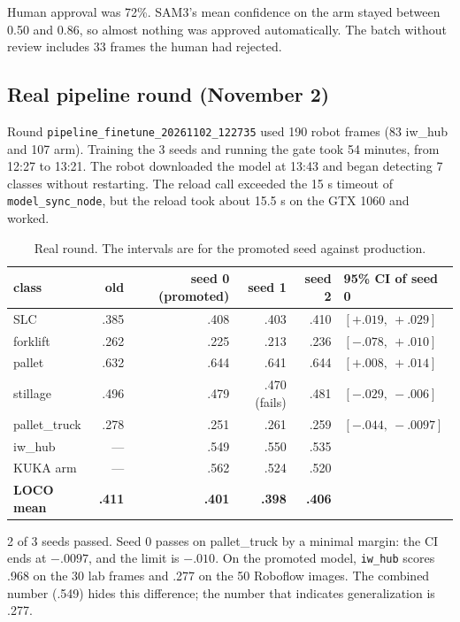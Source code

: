 \documentclass[11pt,a4paper]{article}
\begin{document}
Human approval was 72\%. SAM3's mean confidence on the arm stayed between 0.50 and
0.86, so almost nothing was approved automatically. The batch without review
includes 33 frames the human had rejected.

\subsection{Real pipeline round (November 2)}

Round \texttt{pipeline\_finetune\_20261102\_122735} used 190 robot frames (83
iw\_hub and 107 arm). Training the 3 seeds and running the gate took 54 minutes,
from 12:27 to 13:21. The robot downloaded the model at 13:43 and began detecting 7
classes without restarting. The reload call exceeded the 15 s timeout of
\texttt{model\_sync\_node}, but the reload took about 15.5 s on the GTX 1060 and
worked.

\begin{table}[H]
\centering\small
\caption{Real round. The intervals are for the promoted seed against production.}
\label{tab:round}
\begin{tabular}{lrrrrl}
\toprule
class & old & seed 0 (promoted) & seed 1 & seed 2 & 95\% CI of seed 0 \\
\midrule
SLC & .385 & .408 & .403 & .410 & $[+.019,\ +.029]$ \\
forklift & .262 & .225 & .213 & .236 & $[-.078,\ +.010]$ \\
pallet & .632 & .644 & .641 & .644 & $[+.008,\ +.014]$ \\
stillage & .496 & .479 & .470 (fails) & .481 & $[-.029,\ -.006]$ \\
pallet\_truck & .278 & .251 & .261 & .259 & $[-.044,\ -.0097]$ \\
iw\_hub & --- & .549 & .550 & .535 & \\
KUKA arm & --- & .562 & .524 & .520 & \\
\textbf{LOCO mean} & \textbf{.411} & \textbf{.401} & \textbf{.398} & \textbf{.406} & \\
\bottomrule
\end{tabular}
\end{table}

2 of 3 seeds passed. Seed 0 passes on pallet\_truck by a minimal margin: the CI
ends at $-.0097$, and the limit is $-.010$. On the promoted model, \texttt{iw\_hub}
scores .968 on the 30 lab frames and .277 on the 50 Roboflow images. The combined
number (.549) hides this difference; the number that indicates generalization is
.277.
\end{document}
